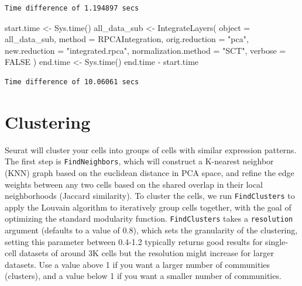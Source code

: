 \documentclass[
  letterpaper,
  DIV=11,
  numbers=noendperiod]{scrreprt}
\newenvironment{Shaded}{\begin{snugshade}}{\end{snugshade}}
\newcommand{\AttributeTok}[1]{\textcolor[rgb]{0.40,0.45,0.13}{#1}}
\newcommand{\ConstantTok}[1]{\textcolor[rgb]{0.56,0.35,0.01}{#1}}
\newcommand{\FunctionTok}[1]{\textcolor[rgb]{0.28,0.35,0.67}{#1}}
\newcommand{\NormalTok}[1]{\textcolor[rgb]{0.00,0.23,0.31}{#1}}
\newcommand{\OtherTok}[1]{\textcolor[rgb]{0.00,0.23,0.31}{#1}}
\newcommand{\SpecialCharTok}[1]{\textcolor[rgb]{0.37,0.37,0.37}{#1}}
\newcommand{\StringTok}[1]{\textcolor[rgb]{0.13,0.47,0.30}{#1}}
\begin{document}
\begin{verbatim}
Time difference of 1.194897 secs
\end{verbatim}

\begin{Shaded}
\begin{Highlighting}[]
\NormalTok{start.time }\OtherTok{\textless{}{-}} \FunctionTok{Sys.time}\NormalTok{()}
\NormalTok{all\_data\_sub }\OtherTok{\textless{}{-}} \FunctionTok{IntegrateLayers}\NormalTok{(}
  \AttributeTok{object =}\NormalTok{ all\_data\_sub, }\AttributeTok{method =}\NormalTok{ RPCAIntegration,}
  \AttributeTok{orig.reduction =} \StringTok{"pca"}\NormalTok{, }\AttributeTok{new.reduction =} \StringTok{"integrated.rpca"}\NormalTok{, }\AttributeTok{normalization.method =} \StringTok{"SCT"}\NormalTok{,}
  \AttributeTok{verbose =} \ConstantTok{FALSE}
\NormalTok{)}
\NormalTok{end.time }\OtherTok{\textless{}{-}} \FunctionTok{Sys.time}\NormalTok{()}
\NormalTok{end.time }\SpecialCharTok{{-}}\NormalTok{ start.time}
\end{Highlighting}
\end{Shaded}

\begin{verbatim}
Time difference of 10.06061 secs
\end{verbatim}

\section{Clustering}\label{clustering}

Seurat will cluster your cells into groups of cells with similar
expression patterns. The first step is \texttt{FindNeighbors}, which
will construct a K-nearest neighbor (KNN) graph based on the euclidean
distance in PCA space, and refine the edge weights between any two cells
based on the shared overlap in their local neighborhoods (Jaccard
similarity). To cluster the cells, we run \texttt{FindClusters} to apply
the Louvain algorithm to iteratively group cells together, with the goal
of optimizing the standard modularity function. \texttt{FindClusters}
takes a \texttt{resolution} argument (defaults to a value of 0.8), which
sets the granularity of the clustering, setting this parameter between
0.4-1.2 typically returns good results for single-cell datasets of
around 3K cells but the resolution might increase for larger datasets.
Use a value above 1 if you want a larger number of communities
(clusters), and a value below 1 if you want a smaller number of
communities.
\end{document}
